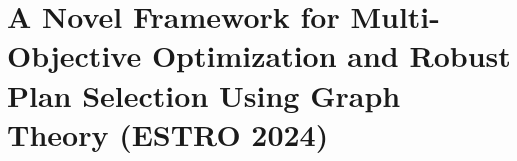 

\section[Novel Dosimetry Automation Approach with Graph Theory]{A Novel Framework for Multi-Objective Optimization and Robust Plan Selection Using Graph Theory (ESTRO 2024)}

